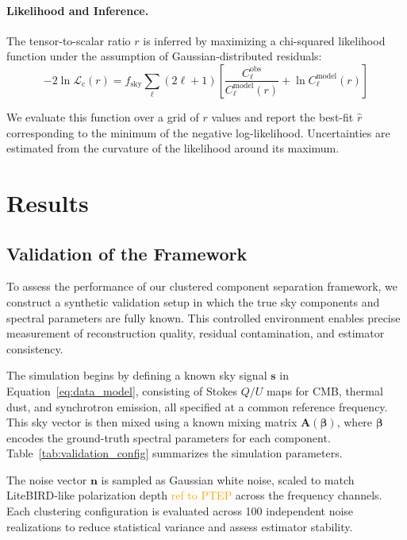 \documentclass[fleqn,usenatbib]{mnras}
\newcommand{\je}[1]{\textcolor{orange}{#1}}
\begin{document}
\paragraph{Likelihood and Inference.}
The tensor-to-scalar ratio \( r \) is inferred by maximizing a chi-squared likelihood function under the assumption of Gaussian-distributed residuals:
\begin{equation}
-2 \ln \mathcal{L}_{\mathrm{c}}(r) = f_{\mathrm{sky}} \sum_\ell (2\ell + 1) \left[ \frac{C_\ell^{\mathrm{obs}}}{C_\ell^{\mathrm{model}}(r)} + \ln C_\ell^{\mathrm{model}}(r) \right]
\end{equation}


We evaluate this function over a grid of \( r \) values and report the best-fit \( \hat{r} \) corresponding to the minimum of the negative log-likelihood. Uncertainties are estimated from the curvature of the likelihood around its maximum.

\section{Results}
\label{sec:results}

\subsection{Validation of the Framework}
\label{subsec:validation}

To assess the performance of our clustered component separation framework, we construct a synthetic validation setup in which the true sky components and spectral parameters are fully known. This controlled environment enables precise measurement of reconstruction quality, residual contamination, and estimator consistency.

The simulation begins by defining a known sky signal \( \mathbf{s} \) in Equation~\eqref{eq:data_model}, consisting of Stokes \( Q/U \) maps for CMB, thermal dust, and synchrotron emission, all specified at a common reference frequency. This sky vector is then mixed using a known mixing matrix \( \mathbf{A}(\boldsymbol{\beta}) \), where \( \boldsymbol{\beta} \) encodes the ground-truth spectral parameters for each component. Table~\ref{tab:validation_config} summarizes the simulation parameters.

The noise vector \( \mathbf{n} \) is sampled as Gaussian white noise, scaled to match LiteBIRD-like polarization depth \je{ref to PTEP} across the frequency channels. Each clustering configuration is evaluated across 100 independent noise realizations to reduce statistical variance and assess estimator stability.
\end{document}
